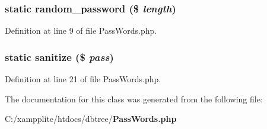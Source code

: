 \subsubsection[{random\_\-password}]{\setlength{\rightskip}{0pt plus 5cm}static random\_\-password (\$ {\em length})\hspace{0.3cm}{\ttfamily  [static]}}\label{class_pass_words_af0547ea02184a3596fb66e667345c006}


Definition at line 9 of file PassWords.php.
\subsubsection[{sanitize}]{\setlength{\rightskip}{0pt plus 5cm}static sanitize (\$ {\em pass})\hspace{0.3cm}{\ttfamily  [static]}}\label{class_pass_words_a039fae6339ac79150a37ee03a43792a4}


Definition at line 21 of file PassWords.php.

The documentation for this class was generated from the following file:\begin{DoxyCompactItemize}
\item 
C:/xampplite/htdocs/dbtree/{\bf PassWords.php}\end{DoxyCompactItemize}
